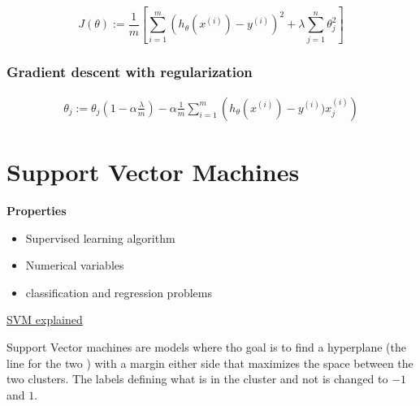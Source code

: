 \begin{equation*}
    J(\theta) := \frac{1}{m}\left[\sum_{i=1}^m (h_{\theta}(x^{(i)}) - y^{(i)})^2 + \lambda\sum_{j=1}^n \theta_j^2\right]
\end{equation*}

\subsubsection{Gradient descent with regularization}
\begin{align*}
    \theta_j := \theta_j\left(1-\alpha\frac{\lambda}{m}\right) - \alpha\frac{1}{m}\sum_{i=1}^m \left(h_{\theta}(x^{(i)}) - y^{(i)})x_j^{(i)}\right)
\end{align*}



\newpage
\section{Support Vector Machines}
\textbf{Properties}
\begin{itemize}
    \item Supervised learning algorithm
    \item Numerical variables 
    \item classification and regression problems
\end{itemize}
\href{https://www.youtube.com/watch?v=efR1C6CvhmE}{SVM explained}

Support Vector machines are models where tho goal is to find a hyperplane (the line for the two ) with a 
margin either side that maximizes the space between the two clusters.
The labels defining what is in the cluster and not is changed to $-1$ and $1$.


